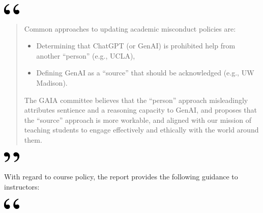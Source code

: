 \documentclass[
]{book}
\begin{document}
\includegraphics[width=0.3125in,height=0.20833in]{open.png}

\begin{quote}
Common approaches to updating academic misconduct policies are:

\begin{itemize}
\item
  Determining that ChatGPT (or GenAI) is prohibited help from another ``person'' (e.g., UCLA),
\item
  Defining GenAI as a ``source'' that should be acknowledged (e.g., UW Madison).
\end{itemize}

The GAIA committee believes that the ``person'' approach misleadingly attributes sentience and a reasoning capacity to GenAI, and proposes that the ``source'' approach is more workable, and aligned with our mission of teaching students to engage effectively and ethically with the world around them.
\end{quote}

\includegraphics[width=0.3125in,height=0.20833in]{close.png}

With regard to course policy, the report provides the following guidance to instructors:

\includegraphics[width=0.3125in,height=0.20833in]{open.png}
\end{document}
